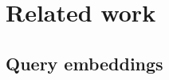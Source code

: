\documentclass[preprint,authoryear,10pt]{sigplanconf}
\begin{document}
%
%
%
%
%
%
%
%
%

\section{Related work}

\subsection{Query embeddings}
\end{document}
